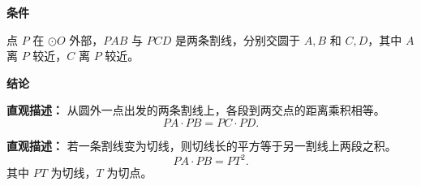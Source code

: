 \begin{statementbox}
	\textbf{\textcolor{CStatement}{条件}}
	\begin{description}[style=nextline, leftmargin=2.8em, labelsep=0.5em, itemsep=0.35em]
		\item[\textbf{\textcolor{CStatement}{条件 1（点在圆外）：}}] 点 $P$ 在 $\odot O$ 外部，$PAB$ 与 $PCD$ 是两条割线，分别交圆于 $A,B$ 和 $C,D$，其中 $A$ 离 $P$ 较近，$C$ 离 $P$ 较近。
	\end{description}

	\textbf{\textcolor{CStatement}{结论}}
	\begin{description}[style=nextline, leftmargin=2.8em, labelsep=0.5em, itemsep=0.45em]
		\item[\textbf{\textcolor{CStatement}{结论一（割线定理）：}}]
			\textbf{\textcolor{CStatement}{直观描述：}}
			从圆外一点出发的两条割线上，各段到两交点的距离乘积相等。
			\[
				PA \cdot PB = PC \cdot PD .
			\]

		\item[\textbf{\textcolor{CStatement}{常见变形（切线情形）：}}]
			\textbf{\textcolor{CStatement}{直观描述：}}
			若一条割线变为切线，则切线长的平方等于另一割线上两段之积。
			\[
				PA \cdot PB = PT^2 .
			\]
			其中 $PT$ 为切线，$T$ 为切点。
	\end{description}
\end{statementbox}

